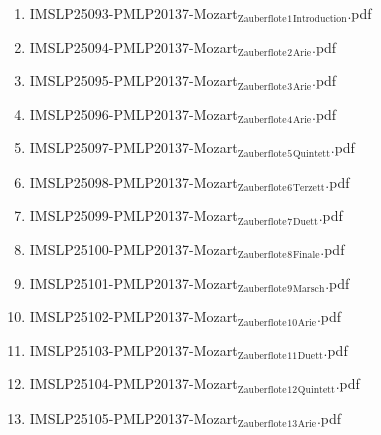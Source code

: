 \documentclass[11pt]{article}
\begin{document}
\begin{enumerate}
\begin{enumerate}
\begin{enumerate}
\item IMSLP25093-PMLP20137-Mozart$_{\text{Zauberflote}}$$_{\text{1}}$$_{\text{Introduction}}$.pdf
\label{sec-1-1-1-1-44-49-3-11-4}

\item IMSLP25094-PMLP20137-Mozart$_{\text{Zauberflote}}$$_{\text{2}}$$_{\text{Arie}}$.pdf
\label{sec-1-1-1-1-44-49-3-11-5}

\item IMSLP25095-PMLP20137-Mozart$_{\text{Zauberflote}}$$_{\text{3}}$$_{\text{Arie}}$.pdf
\label{sec-1-1-1-1-44-49-3-11-6}

\item IMSLP25096-PMLP20137-Mozart$_{\text{Zauberflote}}$$_{\text{4}}$$_{\text{Arie}}$.pdf
\label{sec-1-1-1-1-44-49-3-11-7}

\item IMSLP25097-PMLP20137-Mozart$_{\text{Zauberflote}}$$_{\text{5}}$$_{\text{Quintett}}$.pdf
\label{sec-1-1-1-1-44-49-3-11-8}

\item IMSLP25098-PMLP20137-Mozart$_{\text{Zauberflote}}$$_{\text{6}}$$_{\text{Terzett}}$.pdf
\label{sec-1-1-1-1-44-49-3-11-9}

\item IMSLP25099-PMLP20137-Mozart$_{\text{Zauberflote}}$$_{\text{7}}$$_{\text{Duett}}$.pdf
\label{sec-1-1-1-1-44-49-3-11-10}

\item IMSLP25100-PMLP20137-Mozart$_{\text{Zauberflote}}$$_{\text{8}}$$_{\text{Finale}}$.pdf
\label{sec-1-1-1-1-44-49-3-11-11}

\item IMSLP25101-PMLP20137-Mozart$_{\text{Zauberflote}}$$_{\text{9}}$$_{\text{Marsch}}$.pdf
\label{sec-1-1-1-1-44-49-3-11-12}

\item IMSLP25102-PMLP20137-Mozart$_{\text{Zauberflote}}$$_{\text{10}}$$_{\text{Arie}}$.pdf
\label{sec-1-1-1-1-44-49-3-11-13}

\item IMSLP25103-PMLP20137-Mozart$_{\text{Zauberflote}}$$_{\text{11}}$$_{\text{Duett}}$.pdf
\label{sec-1-1-1-1-44-49-3-11-14}

\item IMSLP25104-PMLP20137-Mozart$_{\text{Zauberflote}}$$_{\text{12}}$$_{\text{Quintett}}$.pdf
\label{sec-1-1-1-1-44-49-3-11-15}

\item IMSLP25105-PMLP20137-Mozart$_{\text{Zauberflote}}$$_{\text{13}}$$_{\text{Arie}}$.pdf
\label{sec-1-1-1-1-44-49-3-11-16}


\end{enumerate}
\end{enumerate}
\end{enumerate}
\end{document}
